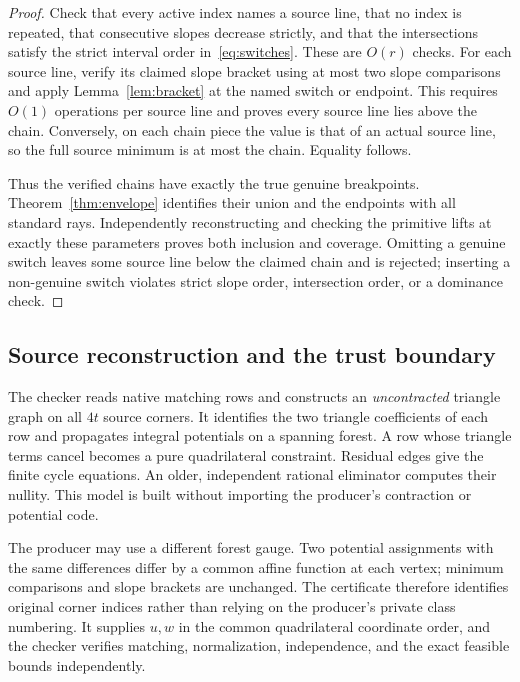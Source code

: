 \documentclass[11pt]{article}
\theoremstyle{definition}
\theoremstyle{remark}
\begin{document}
\begin{proof}
Check that every active index names a source line, that no index is repeated,
that consecutive slopes decrease strictly, and that the intersections satisfy
the strict interval order in~\eqref{eq:switches}. These are $O(r)$ checks.
For each source line, verify its claimed slope bracket using at most two
slope comparisons and apply Lemma~\ref{lem:bracket} at the named switch or
endpoint. This requires $O(1)$ operations per source line and proves every
source line lies above the chain. Conversely, on each chain piece the value
is that of an actual source line, so the full source minimum is at most the
chain. Equality follows.

Thus the verified chains have exactly the true genuine breakpoints.
Theorem~\ref{thm:envelope} identifies their union and the endpoints with all
standard rays. Independently reconstructing and checking the primitive lifts
at exactly these parameters proves both inclusion and coverage. Omitting a
genuine switch leaves some source line below the claimed chain and is rejected;
inserting a non-genuine switch violates strict slope order, intersection
order, or a dominance check.
\end{proof}

\subsection{Source reconstruction and the trust boundary}

The checker reads native matching rows and constructs an \emph{uncontracted}
triangle graph on all $4t$ source corners. It identifies the two triangle
coefficients of each row and propagates integral potentials on a spanning
forest. A row whose triangle terms cancel becomes a pure quadrilateral
constraint. Residual edges give the finite cycle equations. An older,
independent rational eliminator computes their nullity. This model is built
without importing the producer's contraction or potential code.

The producer may use a different forest gauge. Two potential assignments
with the same differences differ by a common affine function at each vertex;
minimum comparisons and slope brackets are unchanged. The certificate
therefore identifies original corner indices rather than relying on the
producer's private class numbering. It supplies $u,w$ in the common
quadrilateral coordinate order, and the checker verifies matching,
normalization, independence, and the exact feasible bounds independently.
\end{document}

